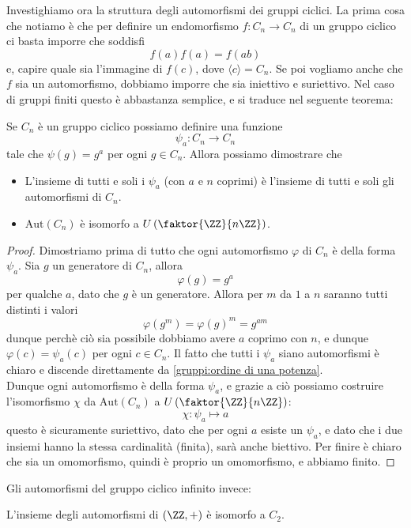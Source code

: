 \documentclass[11pt]{scrartcl}
\begin{document}
	Investighiamo ora la struttura degli automorfismi dei gruppi ciclici. La prima cosa che notiamo è che per definire un endomorfismo $f:C_n\to C_n$ di un gruppo ciclico ci basta imporre che soddisfi 
	$$f(a)f(a)=f(ab)$$
	e, capire quale sia l'immagine di $f(c)$, dove $\langle c \rangle=C_n$. Se poi vogliamo anche che $f$ sia un automorfismo, dobbiamo imporre che sia iniettivo e suriettivo. Nel caso di gruppi finiti questo è abbastanza semplice, e si traduce nel seguente teorema:
	\begin{theorem}
		Se $C_n$ è un gruppo ciclico possiamo definire una funzione
		$$\psi_a:C_n\to C_n$$
		tale che $\psi(g)=g^a$ per ogni $g\in C_n$. Allora possiamo dimostrare che 
		\begin{itemize}
			\item L'insieme di tutti e soli i $\psi_a$ (con $a$ e $n$ coprimi) è l'insieme di tutti e soli gli automorfismi di $C_n$.
			\item $\text{Aut}(C_n)$ è isomorfo a $U\left(\faktor{\ZZ}{n\ZZ}\right)$.
		\end{itemize}
	\end{theorem}
	\begin{proof}
		Dimostriamo prima di tutto che ogni automorfismo $\varphi$ di $C_n$ è della forma $\psi_a$. Sia $g$ un generatore di $C_n$, allora
		$$\varphi(g)=g^a$$
		per qualche $a$, dato che $g$ è un generatore. Allora per $m$ da $1$ a $n$ saranno tutti distinti i valori
		$$\varphi(g^m)=\varphi(g)^m=g^{am}$$
		dunque perchè ciò sia possibile dobbiamo avere $a$ coprimo con $n$, e dunque $\varphi(c)=\psi_a(c)$ per ogni $c\in C_n$. Il fatto che tutti i $\psi_a$ siano automorfismi è chiaro e discende direttamente da \ref{gruppi:ordine di una potenza}. \\
		Dunque ogni automorfismo è della forma $\psi_a$, e grazie a ciò possiamo costruire l'isomorfismo $\chi$ da $\text{Aut}(C_n)$ a $U\left(\faktor{\ZZ}{n\ZZ}\right)$:
		$$\chi:\psi_a\mapsto a$$
		questo è sicuramente suriettivo, dato che per ogni $a$ esiste un $\psi_a$, e dato che i due insiemi hanno la stessa cardinalità (finita), sarà anche biettivo. Per finire è chiaro che sia un omomorfismo, quindi è proprio un omomorfismo, e abbiamo finito.
	\end{proof}
	Gli automorfismi del gruppo ciclico infinito invece:
	\begin{theorem}
		L'insieme degli automorfismi di $(\ZZ,+)$ è isomorfo a $C_2$.
	\end{theorem}
\end{document}
